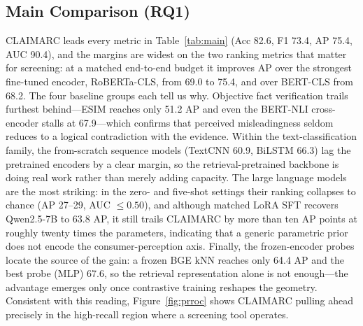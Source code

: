 \documentclass[letterpaper]{article}
\begin{document}
\subsection{Main Comparison (RQ1)}

CLAIMARC leads every metric in Table~\ref{tab:main} (Acc 82.6, F1 73.4, AP 75.4, AUC 90.4), and the margins are widest on the two ranking metrics that matter for screening: at a matched end-to-end budget it improves AP over the strongest fine-tuned encoder, RoBERTa-CLS, from 69.0 to 75.4, and over BERT-CLS from 68.2. The four baseline groups each tell us why. Objective fact verification trails furthest behind---ESIM reaches only 51.2 AP and even the BERT-NLI cross-encoder stalls at 67.9---which confirms that perceived misleadingness seldom reduces to a logical contradiction with the evidence. Within the text-classification family, the from-scratch sequence models (TextCNN 60.9, BiLSTM 66.3) lag the pretrained encoders by a clear margin, so the retrieval-pretrained backbone is doing real work rather than merely adding capacity. The large language models are the most striking: in the zero- and five-shot settings their ranking collapses to chance (AP 27--29, AUC $\le0.50$), and although matched LoRA SFT recovers Qwen2.5-7B to 63.8 AP, it still trails CLAIMARC by more than ten AP points at roughly twenty times the parameters, indicating that a generic parametric prior does not encode the consumer-perception axis. Finally, the frozen-encoder probes locate the source of the gain: a frozen BGE kNN reaches only 64.4 AP and the best probe (MLP) 67.6, so the retrieval representation alone is not enough---the advantage emerges only once contrastive training reshapes the geometry. Consistent with this reading, Figure~\ref{fig:prroc} shows CLAIMARC pulling ahead precisely in the high-recall region where a screening tool operates.
\end{document}
